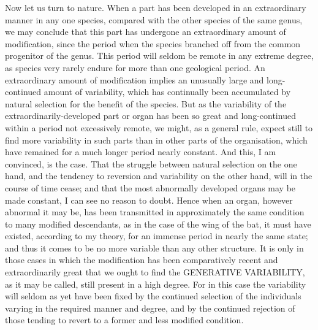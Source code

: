 Now let us turn to nature. When a part has been developed in an extraordinary manner in any one species, compared with the other species of the same genus, we may conclude that this part has undergone an extraordinary amount of modification, since the period when the species branched off from the common progenitor of the genus. This period will seldom be remote in any extreme degree, as species very rarely endure for more than one geological period. An extraordinary amount of modification implies an unusually large and long-continued amount of variability, which has continually been accumulated by natural selection for the benefit of the species. But as the variability of the extraordinarily-developed part or organ has been so great and long-continued within a period not excessively remote, we might, as a general rule, expect still to find more variability in such parts than in other parts of the organisation, which have remained for a much longer period nearly constant. And this, I am convinced, is the case. That the struggle between natural selection on the one hand, and the tendency to reversion and variability on the other hand, will in the course of time cease; and that the most abnormally developed organs may be made constant, I can see no reason to doubt. Hence when an organ, however abnormal it may be, has been transmitted in approximately the same condition to many modified descendants, as in the case of the wing of the bat, it must have existed, according to my theory, for an immense period in nearly the same state; and thus it comes to be no more variable than any other structure. It is only in those cases in which the modification has been comparatively recent and extraordinarily great that we ought to find the GENERATIVE VARIABILITY, as it may be called, still present in a high degree. For in this case the variability will seldom as yet have been fixed by the continued selection of the individuals varying in the required manner and degree, and by the continued rejection of those tending to revert to a former and less modified condition.
